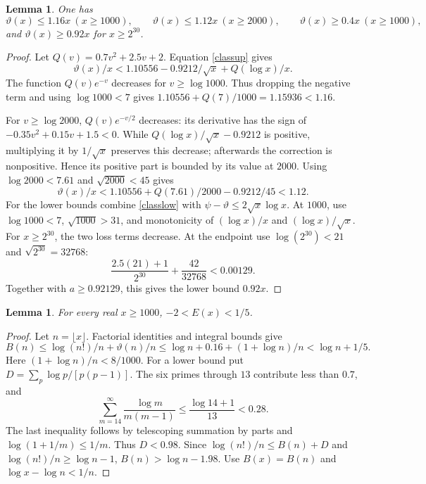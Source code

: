 \documentclass[11pt]{article}
\newtheorem{lemma}[theorem]{Lemma}
\begin{document}
\begin{lemma}\label{theta}
One has
\[
 \vartheta(x)\le1.16x\ (x\ge1000),\qquad
 \vartheta(x)\le1.12x\ (x\ge2000),\qquad
 \vartheta(x)\ge0.4x\ (x\ge1000),
\]
and $\vartheta(x)\ge0.92x$ for $x\ge2^{30}$.
\end{lemma}
\begin{proof}
Let $Q(v)=0.7v^2+2.5v+2$. Equation \eqref{classup} gives
\[
 \vartheta(x)/x<1.10556-0.9212/\sqrt x+Q(\log x)/x.
\]
The function $Q(v)e^{-v}$ decreases for $v\ge\log1000$.
Thus dropping the negative term and using $\log1000<7$ gives
$1.10556+Q(7)/1000=1.15936<1.16$.

For $v\ge\log2000$, $Q(v)e^{-v/2}$ decreases: its derivative has
the sign of $-0.35v^2+0.15v+1.5<0$.
While $Q(\log x)/\sqrt x-0.9212$ is positive, multiplying it by
$1/\sqrt x$ preserves this decrease; afterwards the correction is
nonpositive. Hence its positive part is bounded by its value at $2000$.
Using $\log2000<7.61$ and $\sqrt{2000}<45$ gives
\[
 \vartheta(x)/x<
 1.10556+Q(7.61)/2000-0.9212/45<1.12.
\]
For the lower bounds combine \eqref{classlow} with
$\psi-\vartheta\le2\sqrt x\log x$.
At $1000$, use $\log1000<7$, $\sqrt{1000}>31$, and monotonicity of
$(\log x)/x$ and $(\log x)/\sqrt x$.
For $x\ge2^{30}$, the two loss terms decrease.
At the endpoint use $\log(2^{30})<21$ and $\sqrt{2^{30}}=32768$:
\[
 \frac{2.5(21)+1}{2^{30}}+\frac{42}{32768}<0.00129.
\]
Together with $a\ge0.92129$, this gives the lower bound $0.92x$.
\end{proof}

\begin{lemma}\label{E}
For every real $x\ge1000$, $-2<E(x)<1/5$.
\end{lemma}
\begin{proof}
Let $n=\lfloor x\rfloor$.
Factorial identities and integral bounds give
\[
 B(n)\le\log(n!)/n+\vartheta(n)/n
 \le\log n+0.16+(1+\log n)/n<\log n+1/5.
\]
Here $(1+\log n)/n<8/1000$.
For a lower bound put $D=\sum_p\log p/[p(p-1)]$.
The six primes through $13$ contribute less than $0.7$, and
\[
 \sum_{m=14}^\infty\frac{\log m}{m(m-1)}
 \le\frac{\log14+1}{13}<0.28.
\]
The last inequality follows by telescoping summation by parts and
$\log(1+1/m)\le1/m$.
Thus $D<0.98$. Since $\log(n!)/n\le B(n)+D$ and
$\log(n!)/n\ge\log n-1$, $B(n)>\log n-1.98$.
Use $B(x)=B(n)$ and $\log x-\log n<1/n$.
\end{proof}
\end{document}
